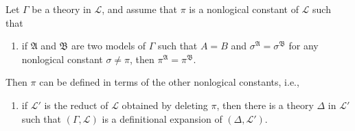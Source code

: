 Let $\Gamma$ be a theory in $\mathcal{L}$, and assume that $\pi$ is a nonlogical constant of $\mathcal{L}$ such that

\begin{enumerate}
\item[(i)] if $\mathfrak{A}$ and $\mathfrak{B}$ are two models of $\Gamma$ such that $A = B$ and $\sigma^{\mathfrak{A}} = \sigma^{\mathfrak{B}}$ for any nonlogical constant $\sigma \neq \pi$, then $\pi^{\mathfrak{A}} = \pi^{\mathfrak{B}}$.
\end{enumerate}

Then $\pi$ can be defined in terms of the other nonlogical constants, i.e.,

\begin{enumerate}
\item[(ii)] if $\mathcal{L}'$ is the reduct of $\mathcal{L}$ obtained by deleting $\pi$, then there is a theory $\Delta$ in $\mathcal{L}'$ such that $(\Gamma, \mathcal{L})$ is a definitional expansion of $(\Delta, \mathcal{L}')$.
\end{enumerate}

